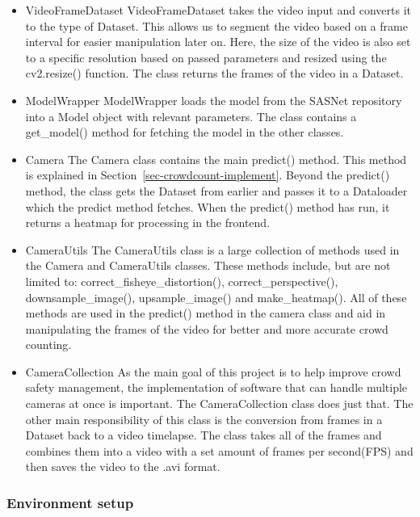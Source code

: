 \documentclass[
]{article}
\begin{document}
\begin{itemize}
\item
  VideoFrameDataset VideoFrameDataset takes the video input and converts
  it to the type of Dataset. This allows us to segment the video based
  on a frame interval for easier manipulation later on. Here, the size
  of the video is also set to a specific resolution based on passed
  parameters and resized using the cv2.resize() function. The class
  returns the frames of the video in a Dataset.\\
\item
  ModelWrapper ModelWrapper loads the model from the SASNet repository
  into a Model object with relevant parameters. The class contains a
  get\_model() method for fetching the model in the other classes.\\
\item
  Camera The Camera class contains the main predict() method. This
  method is explained in Section~\ref{sec-crowdcount-implement}. Beyond
  the predict() method, the class gets the Dataset from earlier and
  passes it to a Dataloader which the predict method fetches. When the
  predict() method has run, it returns a heatmap for processing in the
  frontend.\\
\item
  CameraUtils The CameraUtils class is a large collection of methods
  used in the Camera and CameraUtils classes. These methods include, but
  are not limited to: correct\_fisheye\_distortion(),
  correct\_perspective(), downsample\_image(), upsample\_image() and
  make\_heatmap(). All of these methods are used in the predict() method
  in the camera class and aid in manipulating the frames of the video
  for better and more accurate crowd counting.\\
\item
  CameraCollection As the main goal of this project is to help improve
  crowd safety management, the implementation of software that can
  handle multiple cameras at once is important. The CameraCollection
  class does just that. The other main responsibility of this class is
  the conversion from frames in a Dataset back to a video timelapse. The
  class takes all of the frames and combines them into a video with a
  set amount of frames per second(FPS) and then saves the video to the
  .avi format.\\
\end{itemize}

\hypertarget{sec-environment}{%
\subsubsection{Environment setup}\label{sec-environment}}
\end{document}
